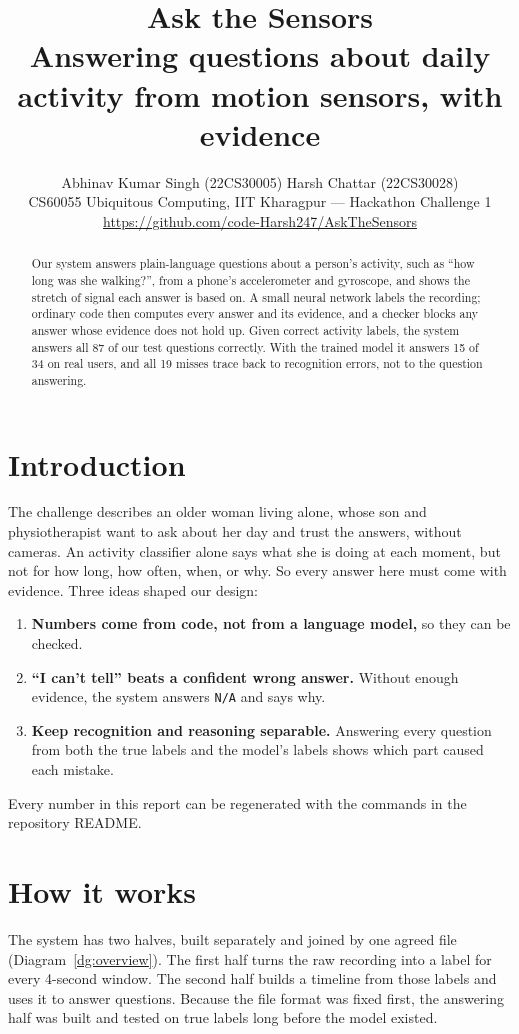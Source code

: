 \documentclass[11pt,a4paper]{article}
\title{\textbf{Ask the Sensors}\\[2pt]\large Answering questions about daily activity from motion sensors, with evidence}
\author{Abhinav Kumar Singh (22CS30005) \qquad Harsh Chattar (22CS30028)\\
\small CS60055 Ubiquitous Computing, IIT Kharagpur --- Hackathon Challenge 1\\
\small \url{https://github.com/code-Harsh247/AskTheSensors}}
\date{}
\newcommand{\code}[1]{\texttt{#1}}
\begin{document}
\maketitle

\begin{abstract}
\noindent Our system answers plain-language questions about a person's activity, such as ``how long was she walking?'', from a phone's accelerometer and gyroscope, and shows the stretch of signal each answer is based on. A small neural network labels the recording; ordinary code then computes every answer and its evidence, and a checker blocks any answer whose evidence does not hold up. Given correct activity labels, the system answers all 87 of our test questions correctly. With the trained model it answers 15 of 34 on real users, and all 19 misses trace back to recognition errors, not to the question answering.
\end{abstract}

\section{Introduction}
The challenge describes an older woman living alone, whose son and physiotherapist want to ask about her day and trust the answers, without cameras. An activity classifier alone says what she is doing at each moment, but not for how long, how often, when, or why. So every answer here must come with evidence. Three ideas shaped our design:
\begin{enumerate}
  \item \textbf{Numbers come from code, not from a language model,} so they can be checked.
  \item \textbf{``I can't tell'' beats a confident wrong answer.} Without enough evidence, the system answers \code{N/A} and says why.
  \item \textbf{Keep recognition and reasoning separable.} Answering every question from both the true labels and the model's labels shows which part caused each mistake.
\end{enumerate}
Every number in this report can be regenerated with the commands in the repository README.

\section{How it works}
The system has two halves, built separately and joined by one agreed file (Diagram~\ref{dg:overview}). The first half turns the raw recording into a label for every 4-second window. The second half builds a timeline from those labels and uses it to answer questions. Because the file format was fixed first, the answering half was built and tested on true labels long before the model existed.
\end{document}
